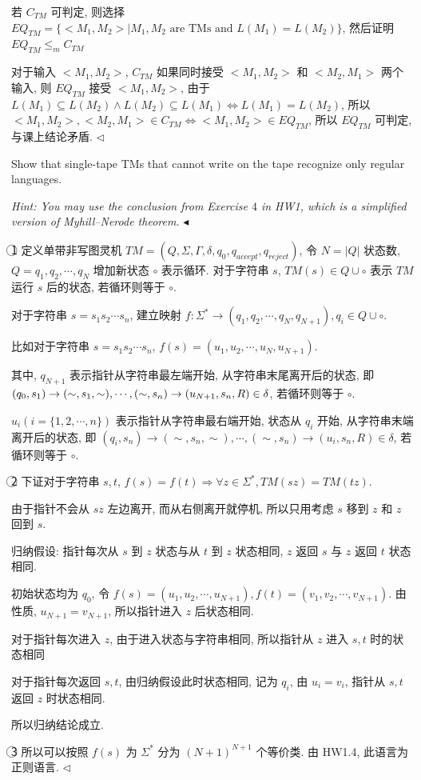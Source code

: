 \documentclass[11pt]{article}
\newenvironment{problem}[2][Problem]{\begin{trivlist}
		\item[\hskip \labelsep {\bfseries #1}\hskip \labelsep {\bfseries #2.}]}{\hfill$\blacktriangleleft$\end{trivlist}}
\newenvironment{answer}[1][Answer]{\begin{trivlist}
		\item[\hskip \labelsep {\bfseries #1.}\hskip \labelsep]}{\hfill$\lhd$\end{trivlist}}
\begin{document}
	\begin{answer}
		若 $C_{TM}$ 可判定, 则选择 $EQ_{TM}=\{<M_1,M_2>\mid M_1,M_2 \text{ are TMs and } L(M_1)=L(M_2)\}$, 然后证明 $EQ_{TM}\leq_mC_{TM}$ 
		
		对于输入 $<M_1,M_2>$, $C_{TM}$ 如果同时接受 $<M_1,M_2>$ 和 $<M_2,M_1>$ 两个输入, 则 $EQ_{TM}$ 接受 $<M_1,M_2>$, 由于 $L(M_1)\subseteq L(M_2)\wedge L(M_2)\subseteq L(M_1)\Leftrightarrow L(M_1)=L(M_2)$, 所以 $<M_1,M_2>,<M_2,M_1>\in C_{TM}\Leftrightarrow <M_1,M_2>\in EQ_{TM}$, 所以 $EQ_{TM}$ 可判定, 与课上结论矛盾.
	\end{answer}
	\begin{problem}{7.(16 points)}
		Show that single-tape TMs that cannot write on the tape recognize only regular languages.
		
		\textit{Hint: You may use the conclusion from Exercise $4$ in HW1, which is a simplified version of Myhill–Nerode theorem. }
	\end{problem}
	\begin{answer}
		\textcircled{1} 定义单带非写图灵机 $TM=(Q,\Sigma,\Gamma,\delta,q_0,q_{accept},q_{reject})$, 令 $N=|Q|$ 状态数, $Q={q_1,q_2,\cdots,q_N}$ 增加新状态 $\circ$ 表示循环. 对于字符串 $s$, $TM(s)\in Q\cup\circ$ 表示 $TM$ 运行 $s$ 后的状态, 若循环则等于 $\circ$.
		
		对于字符串 $s=s_1s_2\cdots s_n$, 建立映射 $f:\Sigma^*\rightarrow(q_1,q_2,\cdots,q_N,q_{N+1}),q_i\in Q\cup\circ$.
		
		比如对于字符串 $s=s_1s_2\cdots s_n$, $f(s)=(u_1,u_2,\cdots,u_N,u_{N+1})$.

		其中, $q_{N+1}$ 表示指针从字符串最左端开始, 从字符串末尾离开后的状态, 即 $(q_0,s_1)\rightarrow(\sim,s_1,\sim),\cdots\\,(\sim,s_n)\rightarrow(u_{N+1},s_n,R)\in\delta$, 若循环则等于 $\circ$.
		
		$u_i(i=\{1,2,\cdots,n\})$ 表示指针从字符串最右端开始, 状态从 $q_i$ 开始, 从字符串末端离开后的状态, 即 $(q_i,s_n)\rightarrow(\sim,s_n,\sim),\cdots,(\sim,s_n)\rightarrow(u_i,s_n,R)\in\delta$, 若循环则等于 $\circ$.
		
		\textcircled{2} 下证对于字符串 $s,t$, $f(s)=f(t)\Rightarrow\forall z\in\Sigma^*,TM(sz)=TM(tz)$.
		
		由于指针不会从 $sz$ 左边离开, 而从右侧离开就停机, 所以只用考虑 $s$ 移到 $z$ 和 $z$ 回到 $s$.
		
		归纳假设: 指针每次从 $s$ 到 $z$ 状态与从 $t$ 到 $z$ 状态相同, $z$ 返回 $s$ 与 $z$ 返回 $t$ 状态相同.
		
		初始状态均为 $q_0$, 令 $f(s)=(u_1,u_2,\cdots ,u_{N+1}),f(t)=(v_1,v_2,\cdots,v_{N+1})$. 由性质, $u_{N+1}=v_{N+1}$, 所以指针进入 $z$ 后状态相同.
		
		对于指针每次进入 $z$, 由于进入状态与字符串相同, 所以指针从 $z$ 进入 $s,t$ 时的状态相同
		
		对于指针每次返回 $s,t$, 由归纳假设此时状态相同, 记为 $q_i$, 由 $u_i=v_i$, 指针从 $s,t$ 返回 $z$ 时状态相同.
		
		所以归纳结论成立.
		
		\textcircled{3} 所以可以按照 $f(s)$ 为 $\Sigma^*$ 分为 $(N+1)^{N+1}$ 个等价类. 由 HW1.4, 此语言为正则语言.
	\end{answer} 
\end{document}

